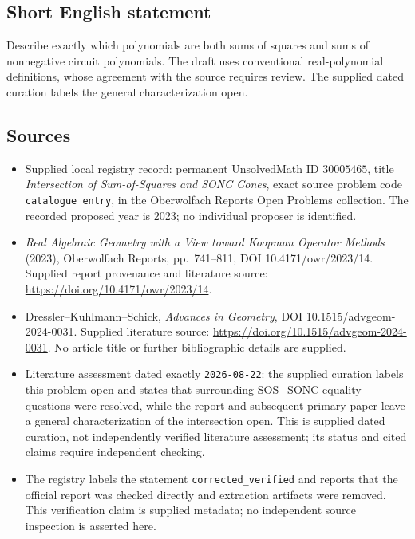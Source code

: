 \documentclass[11pt]{article}
\begin{document}
\subsection{Short English statement}
Describe exactly which polynomials are both sums of squares and sums of nonnegative circuit polynomials. The draft uses conventional real-polynomial definitions, whose agreement with the source requires review. The supplied dated curation labels the general characterization open.
\subsection{Sources}
\begin{itemize}
\item Supplied local registry record: permanent UnsolvedMath ID \(30005465\), title \emph{Intersection of Sum-of-Squares and SONC Cones}, exact source problem code \texttt{catalogue entry}, in the Oberwolfach Reports Open Problems collection. The recorded proposed year is 2023; no individual proposer is identified.
\item \emph{Real Algebraic Geometry with a View toward Koopman Operator Methods} (2023), Oberwolfach Reports, pp.\ 741--811, DOI 10.4171/owr/2023/14. Supplied report provenance and literature source: \url{https://doi.org/10.4171/owr/2023/14}.
\item Dressler--Kuhlmann--Schick, \emph{Advances in Geometry}, DOI 10.1515/advgeom-2024-0031. Supplied literature source: \url{https://doi.org/10.1515/advgeom-2024-0031}. No article title or further bibliographic details are supplied.
\item Literature assessment dated exactly \texttt{2026-08-22}: the supplied curation labels this problem open and states that surrounding SOS+SONC equality questions were resolved, while the report and subsequent primary paper leave a general characterization of the intersection open. This is supplied dated curation, not independently verified literature assessment; its status and cited claims require independent checking.
\item The registry labels the statement \texttt{corrected\_verified} and reports that the official report was checked directly and extraction artifacts were removed. This verification claim is supplied metadata; no independent source inspection is asserted here.
\end{itemize}
\end{document}
